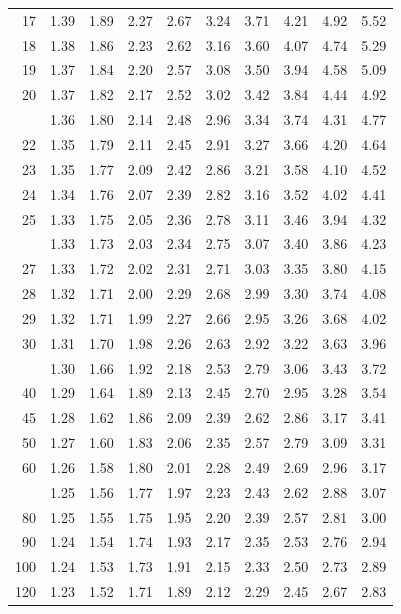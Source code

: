 \documentclass[10pt]{article}
\begin{document}
\begin{longtable}{@{}r!{\vrule width 0.8pt\hspace{0.55em}}rrrrrrrrr@{}}
17 & 1.39 & 1.89 & 2.27 & 2.67 & 3.24 & 3.71 & 4.21 & 4.92 & 5.52 \\
18 & 1.38 & 1.86 & 2.23 & 2.62 & 3.16 & 3.60 & 4.07 & 4.74 & 5.29 \\
19 & 1.37 & 1.84 & 2.20 & 2.57 & 3.08 & 3.50 & 3.94 & 4.58 & 5.09 \\
20 & 1.37 & 1.82 & 2.17 & 2.52 & 3.02 & 3.42 & 3.84 & 4.44 & 4.92 \\
 & 1.36 & 1.80 & 2.14 & 2.48 & 2.96 & 3.34 & 3.74 & 4.31 & 4.77 \\
22 & 1.35 & 1.79 & 2.11 & 2.45 & 2.91 & 3.27 & 3.66 & 4.20 & 4.64 \\
23 & 1.35 & 1.77 & 2.09 & 2.42 & 2.86 & 3.21 & 3.58 & 4.10 & 4.52 \\
24 & 1.34 & 1.76 & 2.07 & 2.39 & 2.82 & 3.16 & 3.52 & 4.02 & 4.41 \\
25 & 1.33 & 1.75 & 2.05 & 2.36 & 2.78 & 3.11 & 3.46 & 3.94 & 4.32 \\
 & 1.33 & 1.73 & 2.03 & 2.34 & 2.75 & 3.07 & 3.40 & 3.86 & 4.23 \\
27 & 1.33 & 1.72 & 2.02 & 2.31 & 2.71 & 3.03 & 3.35 & 3.80 & 4.15 \\
28 & 1.32 & 1.71 & 2.00 & 2.29 & 2.68 & 2.99 & 3.30 & 3.74 & 4.08 \\
29 & 1.32 & 1.71 & 1.99 & 2.27 & 2.66 & 2.95 & 3.26 & 3.68 & 4.02 \\
30 & 1.31 & 1.70 & 1.98 & 2.26 & 2.63 & 2.92 & 3.22 & 3.63 & 3.96 \\
 & 1.30 & 1.66 & 1.92 & 2.18 & 2.53 & 2.79 & 3.06 & 3.43 & 3.72 \\
40 & 1.29 & 1.64 & 1.89 & 2.13 & 2.45 & 2.70 & 2.95 & 3.28 & 3.54 \\
45 & 1.28 & 1.62 & 1.86 & 2.09 & 2.39 & 2.62 & 2.86 & 3.17 & 3.41 \\
50 & 1.27 & 1.60 & 1.83 & 2.06 & 2.35 & 2.57 & 2.79 & 3.09 & 3.31 \\
60 & 1.26 & 1.58 & 1.80 & 2.01 & 2.28 & 2.49 & 2.69 & 2.96 & 3.17 \\
 & 1.25 & 1.56 & 1.77 & 1.97 & 2.23 & 2.43 & 2.62 & 2.88 & 3.07 \\
80 & 1.25 & 1.55 & 1.75 & 1.95 & 2.20 & 2.39 & 2.57 & 2.81 & 3.00 \\
90 & 1.24 & 1.54 & 1.74 & 1.93 & 2.17 & 2.35 & 2.53 & 2.76 & 2.94 \\
100 & 1.24 & 1.53 & 1.73 & 1.91 & 2.15 & 2.33 & 2.50 & 2.73 & 2.89 \\
120 & 1.23 & 1.52 & 1.71 & 1.89 & 2.12 & 2.29 & 2.45 & 2.67 & 2.83 \\

\end{longtable}
\end{document}
